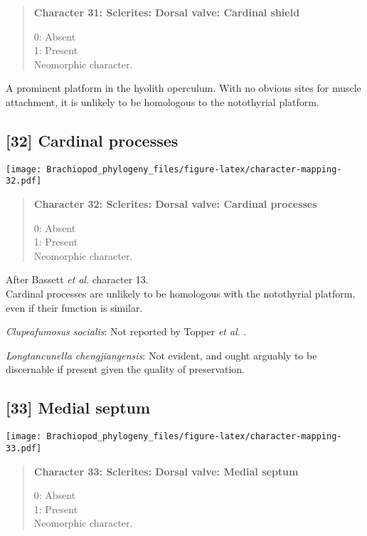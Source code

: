 \documentclass[openany]{book}
\theoremstyle{definition}
\theoremstyle{definition}
\theoremstyle{definition}
\theoremstyle{remark}
\begin{document}
\begin{quote}
\textbf{Character 31: Sclerites: Dorsal valve: Cardinal shield}

0: Absent\\
1: Present\\
Neomorphic character.
\end{quote}

A prominent platform in the hyolith operculum. With no obvious sites for
muscle attachment, it is unlikely to be homologous to the notothyrial
platform.

\subsection*{{[}32{]} Cardinal processes}\label{cardinal-processes}

\texttt{[image: Brachiopod\_phylogeny\_files/figure-latex/character-mapping-32.pdf]}

\begin{quote}
\textbf{Character 32: Sclerites: Dorsal valve: Cardinal processes}

0: Absent\\
1: Present\\
Neomorphic character.
\end{quote}

After Bassett \emph{et al}.
\citeyearpar{Bassett2001Functionalmorphology} character 13.\\
Cardinal processes are unlikely to be homologous with the notothyrial
platform, even if their function is similar.

\hypertarget{Clupeafumosus_socialis-coding-32}{}
\emph{Clupeafumosus socialis}: Not reported by Topper \emph{et al}.
\citeyearpar{Topper2013Reappraisalof}.

\hypertarget{Longtancunella_chengjiangensis-coding-32}{}
\emph{Longtancunella chengjiangensis}: Not evident, and ought arguably
to be discernable if present given the quality of preservation.

\subsection*{{[}33{]} Medial septum}\label{medial-septum}

\texttt{[image: Brachiopod\_phylogeny\_files/figure-latex/character-mapping-33.pdf]}

\begin{quote}
\textbf{Character 33: Sclerites: Dorsal valve: Medial septum}

0: Absent\\
1: Present\\
Neomorphic character.
\end{quote}
\end{document}
